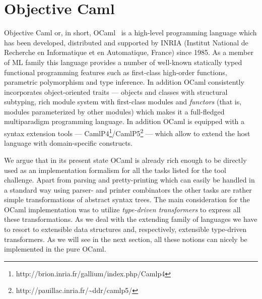 \section{Objective Caml}

Objective Caml or, in short, OCaml~\cite{OcamlDef, Remy} is a high-level programming language which 
has been developed, distributed and supported by INRIA (Institut National de Recherche en 
Informatique et en Automatique, France) since 1985. As a member of ML family this language 
provides a number of well-known statically typed functional programming features such as
first-class high-order functions, parametric polymorphism and type inference. In addition
OCaml consistently incorporates object-oriented traits --- objects and classes with 
structural subtyping, rich module system with first-class modules and \emph{functors} (that is, 
modules parameterized by other modules) which makes it a full-fledged multiparadigm programming
language. In addition OCaml is equipped with a syntax extension tools --- 
CamlP4\footnote{http://brion.inria.fr/gallium/index.php/Camlp4}/CamlP5\footnote{http://pauillac.inria.fr/\textasciitilde ddr/camlp5/} 
--- which allow to extend the host language with domain-specific constructs. 

We argue that in its present state OCaml is already rich enough to be directly used as an 
implementation formalism for all the tasks listed for the tool challenge. Apart from parsing and 
pretty-printing which can easily be handled in a standard way using parser- and printer combinators 
the other tasks are rather simple transformations of abstract syntax trees. The main consideration
for the OCaml implementation was to utilize \emph{type-driven transformers} to express all these
transformations. As we deal with the extending family of languages we have to resort to extensible
data structures and, respectively, extensible type-driven transformers. As we will see in the next 
section, all these notions can nicely be implemented in the pure OCaml. 


